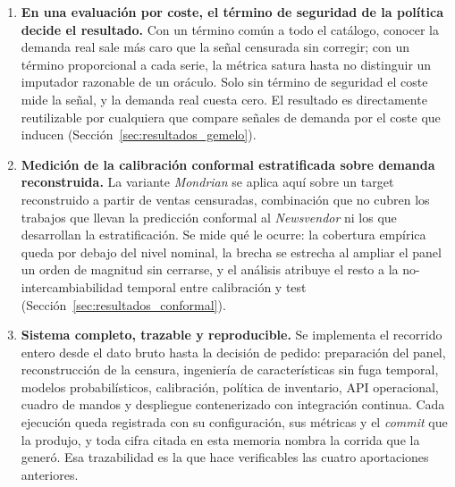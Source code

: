 \begin{enumerate}
    \item \textbf{En una evaluación por coste, el término de seguridad de la política decide el
    resultado.} Con un término común a todo el catálogo, conocer la demanda real sale más caro
    que la señal censurada sin corregir; con un término proporcional a cada serie, la métrica
    satura hasta no distinguir un imputador razonable de un oráculo. Solo sin término de
    seguridad el coste mide la señal, y la demanda real cuesta cero. El resultado es directamente
    reutilizable por cualquiera que compare señales de demanda por el coste que inducen
    (Sección~\ref{sec:resultados_gemelo}).

    \item \textbf{Medición de la calibración conformal estratificada sobre demanda
    reconstruida.} La variante \textit{Mondrian} se aplica aquí sobre un target reconstruido a
    partir de ventas censuradas, combinación que no cubren los trabajos que llevan la predicción
    conformal al \textit{Newsvendor} ni los que desarrollan la estratificación. Se mide qué le
    ocurre: la cobertura empírica queda por debajo del nivel nominal, la brecha se estrecha al
    ampliar el panel un orden de magnitud sin cerrarse, y el análisis atribuye el resto a la
    no-intercambiabilidad temporal entre calibración y test
    (Sección~\ref{sec:resultados_conformal}).

    \item \textbf{Sistema completo, trazable y reproducible.} Se implementa el recorrido entero
    desde el dato bruto hasta la decisión de pedido: preparación del panel, reconstrucción de la
    censura, ingeniería de características sin fuga temporal, modelos probabilísticos,
    calibración, política de inventario, API operacional, cuadro de mandos y despliegue
    contenerizado con integración continua. Cada ejecución queda registrada con su
    configuración, sus métricas y el \textit{commit} que la produjo, y toda cifra citada en esta
    memoria nombra la corrida que la generó. Esa trazabilidad es la que hace verificables las
    cuatro aportaciones anteriores.
\end{enumerate}

